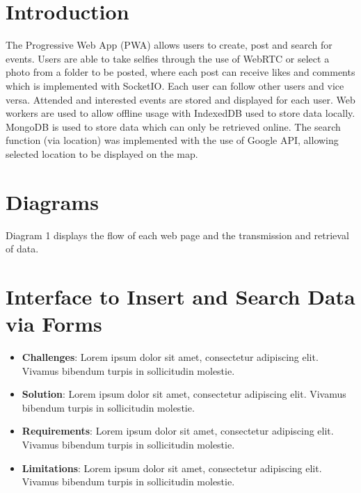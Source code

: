 \documentclass[11pt, a4paper]{article}
\begin{document}
\newpage
\tableofcontents

\newpage
\section{Introduction}
The Progressive Web App (PWA) allows users to create, post and search for events. Users are able to take selfies through the use of WebRTC or select a photo from a folder to be posted, where each post can receive likes and comments which is implemented with SocketIO. Each user can follow other users and vice versa. Attended and interested events are stored and displayed for each user. Web workers are used to allow offline usage with IndexedDB used to store data locally. MongoDB is used to store data which can only be retrieved online. The search function (via location) was implemented with the use of Google API, allowing selected location to be displayed on the map. 

\section{Diagrams}
Diagram 1 displays the flow of each web page and the transmission and retrieval of data. 

\section{Interface to Insert and Search Data via Forms}
\begin{itemize}
  \item \textbf{Challenges}: Lorem ipsum dolor sit amet, consectetur adipiscing elit. Vivamus
  bibendum turpis in sollicitudin molestie.
  \item \textbf{Solution}: Lorem ipsum dolor sit amet, consectetur adipiscing elit. Vivamus bibendum
  turpis in sollicitudin molestie.
  \item \textbf{Requirements}: Lorem ipsum dolor sit amet, consectetur adipiscing elit. Vivamus
  bibendum turpis in sollicitudin molestie.
  \item \textbf{Limitations}: Lorem ipsum dolor sit amet, consectetur adipiscing elit. Vivamus
  bibendum turpis in sollicitudin molestie.
\end{itemize}
\end{document}
